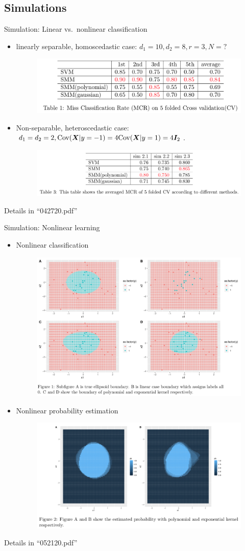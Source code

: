 \documentclass[compress,dvipsnames]{beamer}
\let\olditem\item
\renewcommand\item{\olditem\justifying}
\begin{document}
\subsection{Simulations}
\begin{frame}{Simulation: Linear vs.\ nonlinear classification}
\begin{itemize}
\item linearly separable, homoscedastic case: $d_1=10, d_2=8, r=3, N=?$
\begin{figure}[H]
\centering
\includegraphics[width=.75\textwidth]{L1}
\end{figure}
\item Non-separable, heteroscedastic case: $d_1=d_2=2, \text{Cov}(\bm{X}|y=-1)=4\text{Cov}(\bm{X}|y=1)=4\bm{I}_2$.
\begin{figure}[H]
\centering
\includegraphics[width=.75\textwidth]{L2}
\end{figure}
\end{itemize}
{\scriptsize Details in ``042720.pdf''}
\end{frame}


\begin{frame}{Simulation: Nonlinear learning}
\begin{itemize}
\item Nonlinear classification
\begin{figure}[H]
\centering
\includegraphics[width=.4\textwidth]{NC}
\end{figure}
\item Nonlinear probability estimation
\begin{figure}[H]
\centering
\includegraphics[width=.45\textwidth]{NP}
\end{figure}
\end{itemize}
{\scriptsize Details in ``052120.pdf''}
\end{frame}
\end{document}

